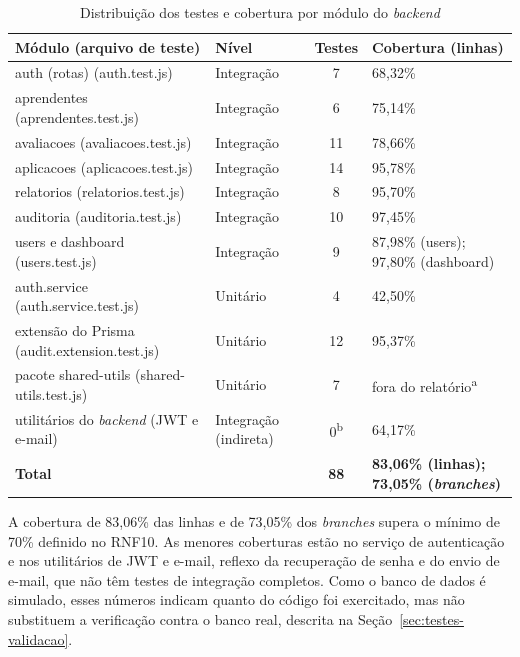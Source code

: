 \begin{table}[H]
\centering
\footnotesize
\caption{Distribuição dos testes e cobertura por módulo do \textit{backend}}
\label{tab:testes_backend}
\begin{tabular}{p{6.4cm} p{2.4cm} c p{3.2cm}}
\hline
\textbf{Módulo (arquivo de teste)} & \textbf{Nível} & \textbf{Testes} & \textbf{Cobertura (linhas)} \\
\hline
auth (rotas) (auth.test.js) & Integração & 7 & 68,32\% \\
aprendentes (aprendentes.test.js) & Integração & 6 & 75,14\% \\
avaliacoes (avaliacoes.test.js) & Integração & 11 & 78,66\% \\
aplicacoes (aplicacoes.test.js) & Integração & 14 & 95,78\% \\
relatorios (relatorios.test.js) & Integração & 8 & 95,70\% \\
auditoria (auditoria.test.js) & Integração & 10 & 97,45\% \\
users e dashboard (users.test.js) & Integração & 9 & 87,98\% (users); 97,80\% (dashboard) \\
auth.service (auth.service.test.js) & Unitário & 4 & 42,50\% \\
extensão do Prisma (audit.extension.test.js) & Unitário & 12 & 95,37\% \\
pacote shared-utils (shared-utils.test.js) & Unitário & 7 & fora do relatório\textsuperscript{a} \\
utilitários do \textit{backend} (JWT e e-mail) & Integração (indireta) & 0\textsuperscript{b} & 64,17\% \\
\hline
\textbf{Total} & & \textbf{88} & \textbf{83,06\% (linhas); 73,05\% (\textit{branches})} \\
\hline
\end{tabular}
\end{table}

A cobertura de 83,06\% das linhas e de 73,05\% dos \textit{branches} supera o mínimo de 70\% definido no RNF10. As menores coberturas estão no serviço de autenticação e nos utilitários de JWT e e-mail, reflexo da recuperação de senha e do envio de e-mail, que não têm testes de integração completos. Como o banco de dados é simulado, esses números indicam quanto do código foi exercitado, mas não substituem a verificação contra o banco real, descrita na Seção~\ref{sec:testes-validacao}.

